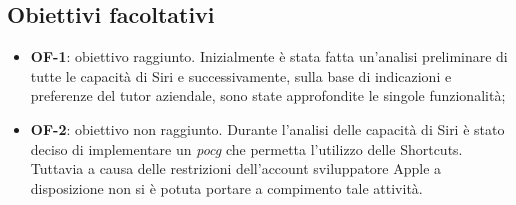 \subsection{Obiettivi facoltativi}
\begin{itemize}
	\item \textbf{OF-1}: obiettivo raggiunto. Inizialmente è stata fatta un'analisi preliminare di tutte le capacità di Siri e successivamente, sulla base di indicazioni e preferenze del tutor aziendale, sono state approfondite le singole funzionalità;
	\item \textbf{OF-2}: obiettivo non raggiunto. Durante l'analisi delle capacità di Siri è stato deciso di implementare un \emph{\gls{pocg}} che permetta l'utilizzo delle Shortcuts. Tuttavia a causa delle restrizioni dell'account sviluppatore Apple a disposizione non si è potuta portare a compimento tale attività.
\end{itemize}

